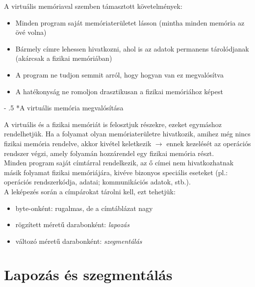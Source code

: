 \documentclass[tikz,12pt,margin=0px]{article}
\makeatletter
\renewcommand\paragraph{%
	\@startsection{paragraph}{4}{0mm}%
	{-\baselineskip}%
	{.5\baselineskip}%
	{\normalfont\normalsize\bfseries}}
\makeatother
\begin{document}
    \noindent A virtuális memóriaval szemben támasztott követelmények:
    \begin{itemize}[topsep=8pt,itemsep=4pt,partopsep=4pt, parsep=4pt]
        \item Minden program saját memóriaterületet lásson (mintha minden memória az övé volna)
        \item Bármely címre lehessen hivatkozni, ahol is az adatok permanens tárolódjanak (akárcsak a fizikai memóriában)
        \item A program ne tudjon semmit arról, hogy hogyan van ez megvalósítva
        \item A hatékonyság ne romoljon drasztikusan a fizikai memóriához képest\\
    \end{itemize}

    \paragraph*{A virtuális memória megvalósítása}

    \noindent A virtuális és a fizikai memóriát is felosztjuk részekre, ezeket egymáshoz rendelhetjük. Ha a folyamat olyan memóriaterületre hivatkozik, amihez még nincs fizikai memória rendelve, akkor kivétel keletkezik $\rightarrow$ ennek kezelését az operációs rendszer végzi, amely folyamán hozzárendel egy fizikai memória részt.\\

    \noindent Minden program saját címtárral rendelkezik, az ő címei nem hivatkozhatnak másik folyamat fizikai memóriájára, kivéve bizonyos speciális eseteket (pl.: operációs rendszerkódja,   adatai;   kommunikációs   adatok,   stb.). \\

    \noindent A leképezés  során a címpárokat tárolni kell, ezt tehetjük:
    \begin{itemize}[topsep=8pt,itemsep=4pt,partopsep=4pt, parsep=4pt]
        \item byte-onként: rugalmas, de a címtáblázat nagy
        \item rögzített méretű darabonként: \emph{lapozás}
        \item változó méretű darabonként: \emph{szegmentálás}
    \end{itemize}

	\section*{Lapozás és szegmentálás}
	
\end{document}
